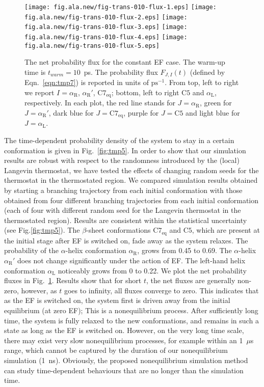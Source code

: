 \documentclass[a4paper,preprint,unsortedaddress,onecolumn]{revtex4-1}
\newcommand{\recheck}[1]{{\color{red} #1}}
\newcommand{\confaa}[0]{{\alpha_{\textrm{R}}}}
\newcommand{\confab}[0]{{\alpha_{\textrm{R}}'}}
\newcommand{\confba}[0]{{\textrm{C}7_{\textrm{eq}}}}
\newcommand{\confbb}[0]{{\textrm{C}5}}
\newcommand{\confc}[0]{{\alpha_{\textrm{L}}}}
\begin{document}
\begin{figure}
  \centering
  \texttt{[image: fig.ala.new/fig-trans-010-flux-1.eps]}
  \texttt{[image: fig.ala.new/fig-trans-010-flux-2.eps]}
  \texttt{[image: fig.ala.new/fig-trans-010-flux-3.eps]}
  \texttt{[image: fig.ala.new/fig-trans-010-flux-4.eps]}
  \texttt{[image: fig.ala.new/fig-trans-010-flux-5.eps]}
  \caption{
    The net probability flux for the constant EF case.
    The warm-up time is $t_{warm} = 10$~ps.
    The probability flux $F_{J,I}(t)$ (defined by Eqn.~\eqref{eqn:tmp7}) is reported in units of $\textrm{ps}^{-1}$.
    From top, left to right we report $I = \confaa$, $\confab$, $\confba$; bottom, left to right $\confbb$ and
    $\confc$, respectively. In each plot, the red line stands for $J=\confaa$,
    green for $J=\confab$, dark blue for $J=\confba$, purple for $J=\confbb$ and light blue
    for $J=\confc$.
    }
  \label{fig:tmp6}
\end{figure}
The time-dependent probability density of the system to stay in a certain
conformation is given in
Fig.~\ref{fig:tmp5}.
\recheck{In order to show that  our simulation results are robust with respect to the randomness introduced by the (local) Langevin thermostat, we have tested the effects of changing random seeds for the thermostat in the thermostated region. We compared simulation results obtained by starting a branching trajectory
  from each initial conformation with those obtained from four different branching trajectories from each initial conformation (each of four with
  different random seed for the Langevin thermostat in the thermostated region).
  Results are consistent within the statistical uncertainty (see Fig.\ref{fig:tmp5}).
}
The $\beta$-sheet conformations $\confba$ and $\confbb$,
which are present at the initial stage after EF is switched on,
\recheck{fade away as the system relaxes}. The
probability of the $\alpha$-helix conformation $\confaa$, grows from 0.45 to 0.69.
The $\alpha$-helix $\confab$  does not change significantly  under the action of EF.
The left-hand helix conformation $\confc$ noticeably grows from 0 to 0.22.
We plot the net probability fluxes in Fig.~\ref{fig:tmp6}.
Results show that for short $t$, the net fluxes are generally non-zero,
however, 
as $t$ goes to infinity,
all fluxes converge to zero. This indicates
that as the EF is switched on, the system first is driven away from the initial
equilibrium (at zero EF);  This is a nonequilibrium process.
\recheck{After sufficiently long time, the system
is fully relaxed to the new conformations,
and remains in such a state as long as the EF is switched on. However, on the very long time scale,
there may exist very slow nonequilibrium processes, for example within an 1~$\mu$s range,
which cannot be captured by the duration of our nonequilibrium simulation (1~ns).
Obviously, the proposed nonequilibrium simulation
method can study time-dependent behaviours that are no longer than
the simulation time. 
}
\end{document}
